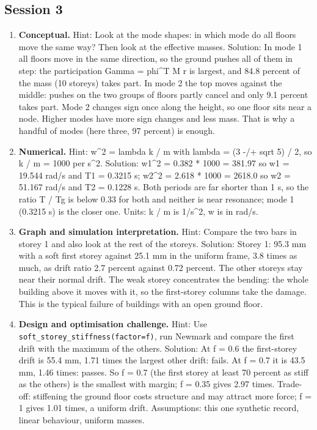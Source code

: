 \documentclass[11pt,a4paper]{article}
\begin{document}
\subsection*{Session 3}
\begin{enumerate}[nosep]
\item \textbf{Conceptual.} Hint: Look at the mode shapes: in which mode do all floors move the same way? Then look at the effective masses. Solution: In mode 1 all floors move in the same direction, so the ground pushes all of them in step: the participation Gamma = phi\textasciicircum{}T M r is largest, and 84.8 percent of the mass (10 storeys) takes part. In mode 2 the top moves against the middle: pushes on the two groups of floors partly cancel and only 9.1 percent takes part. Mode 2 changes sign once along the height, so one floor sits near a node. Higher modes have more sign changes and less mass. That is why a handful of modes (here three, 97 percent) is enough.
\item \textbf{Numerical.} Hint: w\textasciicircum{}2 = lambda k / m with lambda = (3 -/+ sqrt 5) / 2, so k / m = 1000 per s\textasciicircum{}2. Solution: w1\textasciicircum{}2 = 0.382 * 1000 = 381.97 so w1 = 19.544 rad/s and T1 = 0.3215 s; w2\textasciicircum{}2 = 2.618 * 1000 = 2618.0 so w2 = 51.167 rad/s and T2 = 0.1228 s. Both periods are far shorter than 1 s, so the ratio T / Tg is below 0.33 for both and neither is near resonance; mode 1 (0.3215 s) is the closer one. Units: k / m is 1/s\textasciicircum{}2, w is in rad/s.
\item \textbf{Graph and simulation interpretation.} Hint: Compare the two bars in storey 1 and also look at the rest of the storeys. Solution: Storey 1: 95.3 mm with a soft first storey against 25.1 mm in the uniform frame, 3.8 times as much, as drift ratio 2.7 percent against 0.72 percent. The other storeys stay near their normal drift. The weak storey concentrates the bending: the whole building above it moves with it, so the first-storey columns take the damage. This is the typical failure of buildings with an open ground floor.
\item \textbf{Design and optimisation challenge.} Hint: Use \texttt{soft\_storey\_stiffness(factor=f)}, run Newmark and compare the first drift with the maximum of the others. Solution: At f = 0.6 the first-storey drift is 55.4 mm, 1.71 times the largest other drift: fails. At f = 0.7 it is 43.5 mm, 1.46 times: passes. So f = 0.7 (the first storey at least 70 percent as stiff as the others) is the smallest with margin; f = 0.35 gives 2.97 times. Trade-off: stiffening the ground floor costs structure and may attract more force; f = 1 gives 1.01 times, a uniform drift. Assumptions: this one synthetic record, linear behaviour, uniform masses.
\end{enumerate}
\end{document}

